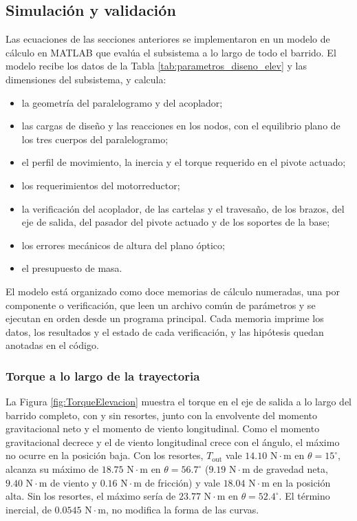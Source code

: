 \documentclass[../../General.tex]{subfiles}
\begin{document}
\subsection{Simulación y validación}

Las ecuaciones de las secciones anteriores se implementaron en un modelo de cálculo en MATLAB que evalúa el subsistema a lo largo de todo el barrido. El modelo recibe los datos de la Tabla \ref{tab:parametros_diseno_elev} y las dimensiones del subsistema, y calcula:
\begin{itemize}
    \item la geometría del paralelogramo y del acoplador;
    \item las cargas de diseño y las reacciones en los nodos, con el equilibrio plano de los tres cuerpos del paralelogramo;
    \item el perfil de movimiento, la inercia y el torque requerido en el pivote actuado;
    \item los requerimientos del motorreductor;
    \item la verificación del acoplador, de las cartelas y el travesaño, de los brazos, del eje de salida, del pasador del pivote actuado y de los soportes de la base;
    \item los errores mecánicos de altura del plano óptico;
    \item el presupuesto de masa.
\end{itemize}
El modelo está organizado como doce memorias de cálculo numeradas, una por componente o verificación, que leen un archivo común de parámetros y se ejecutan en orden desde un programa principal. Cada memoria imprime los datos, los resultados y el estado de cada verificación, y las hipótesis quedan anotadas en el código.

\subsubsection{Torque a lo largo de la trayectoria}\label{subsubsec:torque_tray_elev}

La Figura \ref{fig:TorqueElevacion} muestra el torque en el eje de salida a lo largo del barrido completo, con y sin resortes, junto con la envolvente del momento gravitacional neto y el momento de viento longitudinal. Como el momento gravitacional decrece y el de viento longitudinal crece con el ángulo, el máximo no ocurre en la posición baja. Con los resortes, $T_{\text{out}}$ vale $14.10\text{ N}\cdot\text{m}$ en $\theta = 15^\circ$, alcanza su máximo de $18.75\text{ N}\cdot\text{m}$ en $\theta = 56.7^\circ$ ($9.19\text{ N}\cdot\text{m}$ de gravedad neta, $9.40\text{ N}\cdot\text{m}$ de viento y $0.16\text{ N}\cdot\text{m}$ de fricción) y vale $18.04\text{ N}\cdot\text{m}$ en la posición alta. Sin los resortes, el máximo sería de $23.77\text{ N}\cdot\text{m}$ en $\theta = 52.4^\circ$. El término inercial, de $0.0545\text{ N}\cdot\text{m}$, no modifica la forma de las curvas.
\end{document}
